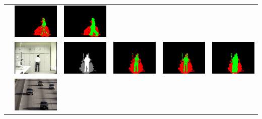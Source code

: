 \documentclass[12pt]{article}
\begin{document}
\begin{landscape}
\begin{table}[t]
\begin{tabular}{m{0.1cm}m{2.3cm}m{2.55cm}|m{2.3cm}m{2.3cm}m{2.3cm}}
      &
      \includegraphics[width=1in]{figures/aton_lab_0151_hsv_results.png}
      &
      \includegraphics[width=1in]{figures/aton_lab_0151_ncc_results.png}
      \\
      &
      \includegraphics[width=1in]{figures/aton_lab_0301_original.png}
      &
      \includegraphics[width=1in]{figures/aton_lab_0301_ground_truth.png}
      &
      \includegraphics[width=1in]{figures/aton_lab_0301_ml_results.png}
      &
      \includegraphics[width=1in]{figures/aton_lab_0301_hsv_results.png}
      &
      \includegraphics[width=1in]{figures/aton_lab_0301_ncc_results.png}
      \\ 
      &
      \includegraphics[width=1in]{figures/aton_highway1_0085_original.png}

\end{tabular}
\end{table}
\end{landscape}
\end{document}
